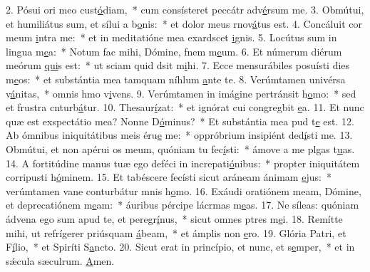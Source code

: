 2. Pósui ori meo cust\uline{ó}diam,~* cum consísteret peccátr adv\uline{é}rsum me.
3. Obmútui, et humiliátus sum, et sílui a b\uline{o}nis:~* et dolor meus rnov\uline{á}tus est.
4. Concáluit cor meum \uline{i}ntra me:~* et in meditatióne mea exardscet \uline{i}gnis.
5. Locútus sum in lingua m\uline{e}a:~* Notum fac mihi, Dómine, fnem m\uline{e}um.
6. Et númerum diérum meórum \uline{qui}s est:~* ut sciam quid dsit m\uline{i}hi.
7. Ecce mensurábiles posuísti dies m\uline{e}os:~* et substántia mea tamquam níhlum \uline{a}nte te.
8. Verúmtamen univérsa v\uline{á}nitas,~* omnis hmo v\uline{i}vens.
9. Verúmtamen in imágine pertránsit h\uline{o}mo:~* sed et frustra cnturb\uline{á}tur.
10. Thesaur\uline{í}zat:~* et ignórat cui congregbit \uline{e}a.
11. Et nunc quæ est exspectátio mea? Nonne D\uline{ó}minus?~* Et substántia mea pud t\uline{e} est.
12. Ab ómnibus iniquitátibus meis éru\uline{e} me:~* oppróbrium insipiént ded\uline{í}sti me.
13. Obmútui, et non apérui os meum, quóniam tu fec\uline{í}sti:~* ámove a me plgas t\uline{u}as.
14. A fortitúdine manus tuæ ego deféci in increpati\uline{ó}nibus:~* propter iniquitátem corripusti h\uline{ó}minem.
15. Et tabéscere fecísti sicut aráneam ánimam \uline{e}jus:~* verúmtamen vane conturbátur mnis h\uline{o}mo.
16. Exáudi oratiónem meam, Dómine, et deprecatiónem m\uline{e}am:~* áuribus pércipe lácrmas m\uline{e}as.
17. Ne síleas: quóniam ádvena ego sum apud te, et peregr\uline{í}nus,~* sicut omnes ptres m\uline{e}i.
18. Remítte mihi, ut refrígerer priúsquam \uline{á}beam,~* et ámplis non \uline{e}ro.
19. Glória Patri, et F\uline{í}lio,~* et Spiríti S\uline{a}ncto.
20. Sicut erat in princípio, et nunc, et s\uline{e}mper,~* et in sǽcula sæculrum. \uline{A}men.
